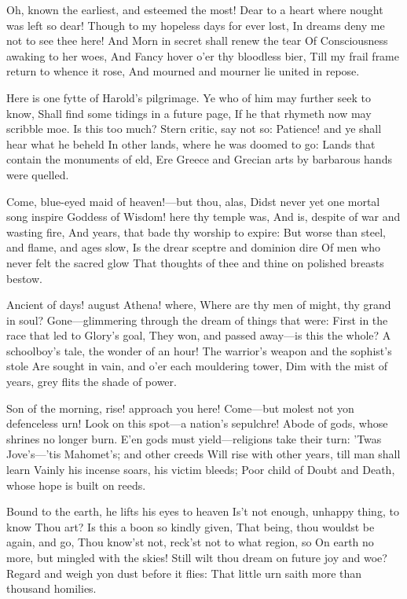 \documentclass[10pt,twocolumn]{book}
\begin{document}
   Oh, known the earliest, and esteemed the most!
   Dear to a heart where nought was left so dear!
   Though to my hopeless days for ever lost,
   In dreams deny me not to see thee here!
   And Morn in secret shall renew the tear
   Of Consciousness awaking to her woes,
   And Fancy hover o'er thy bloodless bier,
   Till my frail frame return to whence it rose,
And mourned and mourner lie united in repose.


   Here is one fytte of Harold's pilgrimage.
   Ye who of him may further seek to know,
   Shall find some tidings in a future page,
   If he that rhymeth now may scribble moe.
   Is this too much?  Stern critic, say not so:
   Patience! and ye shall hear what he beheld
   In other lands, where he was doomed to go:
   Lands that contain the monuments of eld,
Ere Greece and Grecian arts by barbarous hands were quelled.


\canto


   Come, blue-eyed maid of heaven!---but thou, alas,
   Didst never yet one mortal song inspire\textemdash
   Goddess of Wisdom! here thy temple was,
   And is, despite of war and wasting fire,
   And years, that bade thy worship to expire:
   But worse than steel, and flame, and ages slow,
   Is the drear sceptre and dominion dire
   Of men who never felt the sacred glow
That thoughts of thee and thine on polished breasts bestow.


   Ancient of days! august Athena! where,
   Where are thy men of might, thy grand in soul?
   Gone---glimmering through the dream of things that were:
   First in the race that led to Glory's goal,
   They won, and passed away---is this the whole?
   A schoolboy's tale, the wonder of an hour!
   The warrior's weapon and the sophist's stole
   Are sought in vain, and o'er each mouldering tower,
Dim with the mist of years, grey flits the shade of power.


   Son of the morning, rise! approach you here!
   Come---but molest not yon defenceless urn!
   Look on this spot---a nation's sepulchre!
   Abode of gods, whose shrines no longer burn.
   E'en gods must yield---religions take their turn:
   'Twas Jove's---'tis Mahomet's; and other creeds
   Will rise with other years, till man shall learn
   Vainly his incense soars, his victim bleeds;
Poor child of Doubt and Death, whose hope is built on reeds.


   Bound to the earth, he lifts his eyes to heaven\textemdash
   Is't not enough, unhappy thing, to know
   Thou art?  Is this a boon so kindly given,
   That being, thou wouldst be again, and go,
   Thou know'st not, reck'st not to what region, so
   On earth no more, but mingled with the skies!
   Still wilt thou dream on future joy and woe?
   Regard and weigh yon dust before it flies:
That little urn saith more than thousand homilies.
\end{document}
